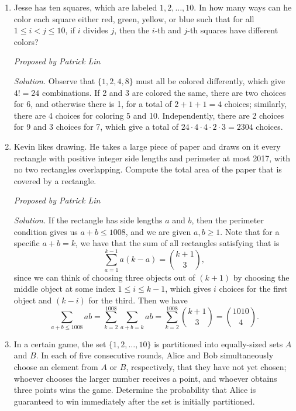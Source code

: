 \documentclass[10pt]{article}
\newcounter{enum}
\newcommand{\proposed}[1]
{
\vspace{5pt}
\noindent\textit{Proposed by #1}
}
\newcommand{\solution}
{
\vspace{5pt}
\noindent\textit{Solution.}\qquad
}
\begin{document}
\begin{enumerate}

\item Jesse has ten squares, which are labeled $1, 2, \dots, 10$. In how many ways can he color each square either red, green, yellow, or blue such that for all $1 \le i < j \le 10$, if $i$ divides $j$, then the $i$-th and $j$-th squares have different colors?

\proposed{Patrick Lin}

\solution Observe that $\{1,2,4,8\}$ must all be colored differently, which give $4! = 24$ combinations. If 2 and 3 are colored the same, there are two choices for 6, and otherwise there is 1, for a total of $2+1+1 = 4$ choices; similarly, there are 4 choices for coloring 5 and 10. Independently, there are 2 choices for 9 and 3 choices for 7, which give a total of $24\cdot4\cdot4\cdot2\cdot3 = \boxed{2304}$ choices.





\item Kevin likes drawing. He takes a large piece of paper and draws on it every rectangle with positive integer side lengths and perimeter at most 2017, with no two rectangles overlapping. Compute the total area of the paper that is covered by a rectangle.

\proposed{Patrick Lin}

\solution If the rectangle has side lengths $a$ and $b$, then the perimeter condition gives us $a + b \le 1008$, and we are given $a,b \ge 1$. Note that for a specific $a + b = k$, we have that the sum of all rectangles satisfying that is
\[\sum_{a=1}^{k-1} a(k-a) = \binom{k+1}{3},\]
since we can think of choosing three objects out of $(k+1)$ by choosing the middle object at some index $1 \le i \le k-1$, which gives $i$ choices for the first object and $(k-i)$ for the third. Then we have
\[\sum_{a+b\le1008} ab = \sum_{k=2}^{1008} \sum_{a+b=k} ab = \sum_{k=2}^{1008} \binom{k+1}{3} = \boxed{\binom{1010}{4}}.\]





\item In a certain game, the set $\{1, 2, \dots, 10\}$ is partitioned into equally-sized sets $A$ and $B$. In each of five consecutive rounds, Alice and Bob simultaneously choose an element from $A$ or $B$, respectively, that they have not yet chosen; whoever chooses the larger number receives a point, and whoever obtains three points wins the game. Determine the probability that Alice is guaranteed to win immediately after the set is initially partitioned.


\end{enumerate}
\end{document}
